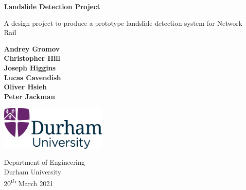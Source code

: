 \begin{titlepage}
\begin{center}
        \vspace*{1cm}
            
        \Huge
        \textbf{Landslide Detection Project}
            
        \vspace{0.5cm}
        \LARGE
        A design project to produce a prototype landslide detection system for Network Rail
            
        \vspace{1.5cm}
            
        \textbf{
        Andrey Gromov\\
        Christopher Hill\\
        Joseph Higgins\\
        Lucas Cavendish\\
        Oliver Hsieh\\
        Peter Jackman}
            
        \vfill
            
        \vspace{0.8cm}
            
        \includegraphics[width=0.4\textwidth]{Images/Logo.png}
        
        \Large
        Department of Engineering\\
        Durham University\\
        20\textsuperscript{th} March 2021
            
    \end{center}
\end{titlepage}